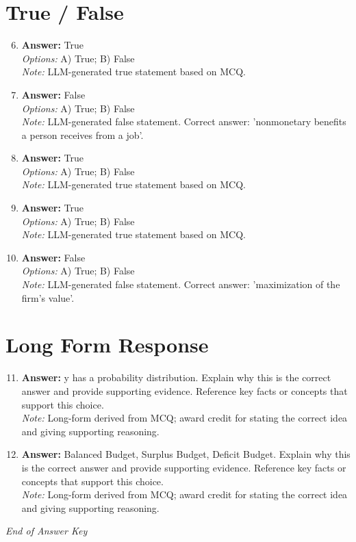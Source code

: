 \documentclass[12pt]{article}
\begin{document}
\section*{True / False}
\begin{enumerate}[label=\arabic*.]
\setcounter{enumi}{5}
\item \textbf{Answer:} True
\\ \textit{Options:} A) True; B) False
\\ \textit{Note:} LLM-generated true statement based on MCQ.
\item \textbf{Answer:} False
\\ \textit{Options:} A) True; B) False
\\ \textit{Note:} LLM-generated false statement. Correct answer: 'nonmonetary benefits a person receives from a job'.
\item \textbf{Answer:} True
\\ \textit{Options:} A) True; B) False
\\ \textit{Note:} LLM-generated true statement based on MCQ.
\item \textbf{Answer:} True
\\ \textit{Options:} A) True; B) False
\\ \textit{Note:} LLM-generated true statement based on MCQ.
\item \textbf{Answer:} False
\\ \textit{Options:} A) True; B) False
\\ \textit{Note:} LLM-generated false statement. Correct answer: 'maximization of the firm's value'.
\end{enumerate}

\section*{Long Form Response}
\begin{enumerate}[label=\arabic*.]
\setcounter{enumi}{10}
\item \textbf{Answer:} y has a probability distribution. Explain why this is the correct answer and provide supporting evidence. Reference key facts or concepts that support this choice.
\\ \textit{Note:} Long-form derived from MCQ; award credit for stating the correct idea and giving supporting reasoning.
\item \textbf{Answer:} Balanced Budget, Surplus Budget, Deficit Budget. Explain why this is the correct answer and provide supporting evidence. Reference key facts or concepts that support this choice.
\\ \textit{Note:} Long-form derived from MCQ; award credit for stating the correct idea and giving supporting reasoning.
\end{enumerate}

\vfill
\noindent\textit{End of Answer Key}
\end{document}
